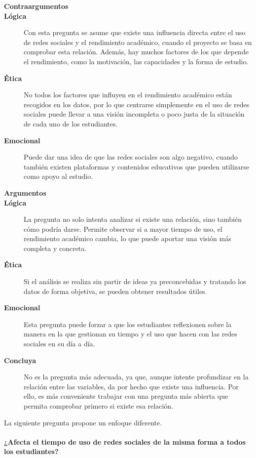 \documentclass[12pt]{article}
\begin{document}
\begin{description}

\item[\textbf{Contraargumentos}]
\item[\textbf{Lógica}] Con esta pregunta se asume que existe una influencia directa entre el uso de redes sociales y el rendimiento académico, cuando el proyecto se basa en comprobar esta relación. Además, hay muchos factores de los que depende el rendimiento, como la motivación, las capacidades y la forma de estudio.
\item[\textbf{Ética}] No todos los factores que influyen en el rendimiento académico están recogidos en los datos, por lo que centrarse simplemente en el uso de redes sociales puede llevar a una visión incompleta o poco justa de la situación de cada uno de los estudiantes.
\item[\textbf{Emocional}] Puede dar una idea de que las redes sociales son algo negativo, cuando también existen plataformas y contenidos educativos que pueden utilizarse como apoyo al estudio.

\item[\textbf{Argumentos}]
\item[\textbf{Lógica}] La pregunta no solo intenta analizar si existe una relación, sino también cómo podría darse. Permite observar si a mayor tiempo de uso, el rendimiento académico cambia, lo que puede aportar una visión más completa y concreta.
\item[\textbf{Ética}] Si el análisis se realiza sin partir de ideas ya preconcebidas y tratando los datos de forma objetiva, se pueden obtener resultados útiles.
\item[\textbf{Emocional}] Esta pregunta puede forzar a que los estudiantes reflexionen sobre la manera en la que gestionan su tiempo y el uso que hacen con las redes sociales en su día a día.
\item[\textbf{Concluya}] No es la pregunta más adecuada, ya que, aunque intente profundizar en la relación entre las variables, da por hecho que existe una influencia. Por ello, es más conveniente trabajar con una pregunta más abierta que permita comprobar primero si existe esa relación.

\end{description}

La siguiente pregunta propone un enfoque diferente.
\\
\\
\textbf{¿Afecta el tiempo de uso de redes sociales de la misma forma a todos los estudiantes?}
\end{document}
